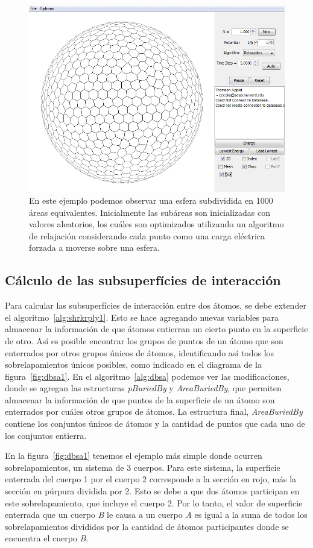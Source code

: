 \begin{figure}[p]
\centering
\centering
\includegraphics[width=\textwidth]{figures/thomson/thomson.png}
\caption[Esfera en el software Thomson Applet]{En este ejemplo podemos observar una esfera subdividida en 1000 áreas equivalentes. Inicialmente las subáreas son inicializadas con valores aleatorios, los cuáles son optimizados utilizando un algoritmo de relajación considerando cada punto como una carga eléctrica forzada a moverse sobre una esfera.}
\label{fig:thomsonfig}
\end{figure}
\cleardoublepage

\subsection{Cálculo de las subsuperfícies de interacción}
\par
Para calcular las subsuperfícies de interacción entre dos átomos, se debe extender el algoritmo~\ref{alg:shrkrply1}.
Esto se hace agregando nuevas variables para almacenar la información de que átomos entierran un cierto punto en la superficie de otro.
Así es posible encontrar los grupos de puntos de un átomo que son enterrados por otros grupos únicos de átomos, identificando así todos los sobrelapamientos únicos posibles, como indicado en el diagrama de la figura~\ref{fig:dbsa1}.
En el algoritmo~\ref{alg:dbsa} podemos ver las modificaciones, donde se agregan las estructuras \textit{pBuriedBy} y \textit{AreaBuriedBy}, que permiten almacenar la información de que puntos de la superficie de un átomo son enterrados por cuáles otros grupos de átomos. 
La estructura final, \textit{AreaBuriedBy} contiene los conjuntos únicos de átomos y la cantidad de puntos que cada uno de los conjuntos entierra.
\par
En la figura~\ref{fig:dbsa1} tenemos el ejemplo más simple donde ocurren sobrelapamientos, un sistema de 3 cuerpos.
Para este sistema, la superficie enterrada del cuerpo 1 por el cuerpo 2 corresponde a la sección en rojo, más la sección en púrpura dividida por 2.
Esto se debe a que dos átomos participan en este sobrelapamiento, que incluye el cuerpo 2.
Por lo tanto, el valor de superficie enterrada que un cuerpo \textit{B} le causa a un cuerpo \textit{A} es igual a la suma de todos los sobrelapamientos divididos por la cantidad de átomos participantes donde se encuentra el cuerpo \textit{B}.


